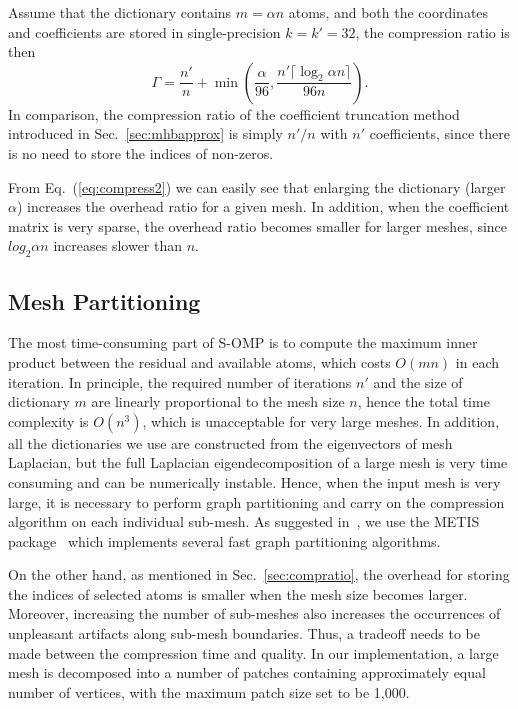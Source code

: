 Assume that the dictionary contains $m=\alpha n$ atoms, and both the
coordinates and coefficients are stored in single-precision $k=k'=32$,
the compression ratio is then
\begin{equation}\label{eq:compress2}
  \Gamma = \frac{n'}{n} + \min(\frac{\alpha}{96}, \frac{n'\lceil\log_2\alpha n\rceil}{96n}).
\end{equation}
In comparison, the compression ratio of the coefficient truncation
method introduced in Sec.~\ref{sec:mhbapprox} is simply $n'/n$ with
$n'$ coefficients, since there is no need to store the indices of
non-zeros.

From Eq.~(\ref{eq:compress2}) we can easily see that enlarging the
dictionary (larger $\alpha$) increases the overhead ratio for a given
mesh. In addition, when the coefficient matrix is very sparse, the
overhead ratio becomes smaller for larger meshes, since $log_2\alpha
n$ increases slower than $n$.

\subsection{Mesh Partitioning}

The most time-consuming part of S-OMP is to compute the maximum inner
product between the residual and available atoms, which costs $O(mn)$
in each iteration. In principle, the required number of iterations
$n'$ and the size of dictionary $m$ are linearly proportional to the
mesh size $n$, hence the total time complexity is $O(n^3)$, which is
unacceptable for very large meshes. In addition, all the dictionaries
we use are constructed from the eigenvectors of mesh Laplacian, but
the full Laplacian eigendecomposition of a large mesh is very time
consuming and can be numerically instable. Hence, when the input mesh
is very large, it is necessary to perform graph partitioning and carry
on the compression algorithm on each individual sub-mesh. As suggested
in~\cite{Karni2000}, we use the METIS package~\cite{karypis1998fast}
which implements several fast graph partitioning algorithms.

On the other hand, as mentioned in Sec.~\ref{sec:compratio}, the
overhead for storing the indices of selected atoms is smaller when the
mesh size becomes larger. Moreover, increasing the number of
sub-meshes also increases the occurrences of unpleasant artifacts
along sub-mesh boundaries. Thus, a tradeoff needs to be made between
the compression time and quality. In our implementation, a large mesh
is decomposed into a number of patches containing approximately equal
number of vertices, with the maximum patch size set to be 1,000.



